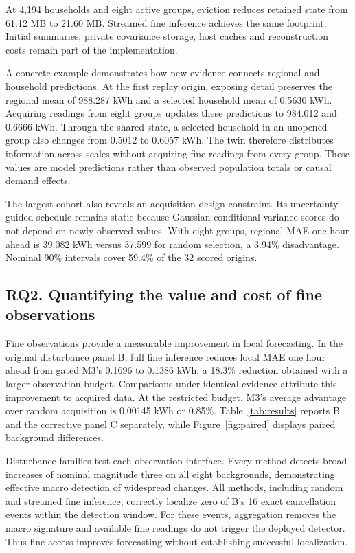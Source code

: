 \documentclass[conference]{IEEEtran}
\newcommand{\FineGainPercent}{18.3}
\begin{document}
At 4,194 households and eight active groups, eviction reduces retained state from 61.12 MB to 21.60 MB. Streamed fine inference achieves the same footprint. Initial summaries, private covariance storage, host caches and reconstruction costs remain part of the implementation.

A concrete example demonstrates how new evidence connects regional and household predictions. At the first replay origin, exposing detail preserves the regional mean of 988.287 kWh and a selected household mean of 0.5630 kWh. Acquiring readings from eight groups updates these predictions to 984.012 and 0.6666 kWh. Through the shared state, a selected household in an unopened group also changes from 0.5012 to 0.6057 kWh. The twin therefore distributes information across scales without acquiring fine readings from every group. These values are model predictions rather than observed population totals or causal demand effects.

The largest cohort also reveals an acquisition design constraint. Its uncertainty guided schedule remains static because Gaussian conditional variance scores do not depend on newly observed values. With eight groups, regional MAE one hour ahead is 39.082 kWh versus 37.599 for random selection, a 3.94\% disadvantage. Nominal 90\% intervals cover 59.4\% of the 32 scored origins.







\subsection{RQ2. Quantifying the value and cost of fine observations}
Fine observations provide a measurable improvement in local forecasting. In the original disturbance panel B, full fine inference reduces local MAE one hour ahead from gated M3's 0.1696 to 0.1386 kWh, a \FineGainPercent{}\% reduction obtained with a larger observation budget. Comparisons under identical evidence attribute this improvement to acquired data. At the restricted budget, M3's average advantage over random acquisition is 0.00145 kWh or 0.85\%. Table~\ref{tab:results} reports B and the corrective panel C separately, while Figure~\ref{fig:paired} displays paired background differences.

Disturbance families test each observation interface. Every method detects broad increases of nominal magnitude three on all eight backgrounds, demonstrating effective macro detection of widespread changes. All methods, including random and streamed fine inference, correctly localize zero of B's 16 exact cancellation events within the detection window. For these events, aggregation removes the macro signature and available fine readings do not trigger the deployed detector. Thus fine access improves forecasting without establishing successful localization.
\end{document}
